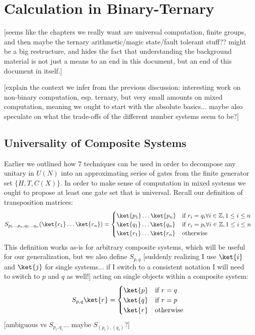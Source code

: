 \chapter[CALCULATION IN BINARY-TERNARY]{Calculation in Binary-Ternary}
[seems like the chapters we really want are universal computation, finite groups, and then maybe the ternary arithmetic/magic state/fault tolerant stuff?? might be a big restructure, and hides the fact that understanding the background material is not just a means to an end in this document, but an end of this document in itself.]

[explain the context we infer from the previous discussion: interesting work on non-binary computation, esp. ternary, but very small amounts on mixed computation, meaning we ought to start with the absolute basics... maybe also speculate on what the trade-offs of the different number systems seem to be?]
\section{Universality of Composite Systems}
Earlier we outlined how 7 techniques can be used in order to decompose any unitary in $U(N)$ into an approximating series of gates from the finite generator set $\{H, T, C(X)\}$. In order to make sense of computation in mixed systems we ought to propose at least one gate set that is universal. Recall our definition of transposition matrices:
\[S_{p_1\dots p_n, q_1\dots q_n}(\ket{r_1}\dots\ket{r_n}) = \begin{cases}
	\ket{p_1}\dots\ket{p_n} & \text{if\ } r_i = q_i \forall i \in \mathbb{Z}, 1 \leq i \leq n \\
	\ket{q_1}\dots\ket{q_n} & \text{if\ } r_i = p_i \forall i \in \mathbb{Z}, 1 \leq i \leq n \\
	\ket{r_1}\dots\ket{r_n} & \text{otherwise}
\end{cases}
\]
This definition works as-is for arbitrary composite systems, which will be useful for our generalization, but we also define $S_{p,q}$ [suddenly realizing I use $\ket{i}$ and $\ket{j}$ for single systems... if I switch to a consistent notation I will need to switch to $p$ and $q$ as well!] acting on single objects within a composite system:
\[S_{p, q}\ket{r} =
\begin{cases}
	\ket{p} & \text{if\ } r = q \\
	\ket{q} & \text{if\ } r = p \\
	\ket{r} & \text{otherwise}
\end{cases}
\]
[ambiguous vs $S_{p_i, q_i}$... maybe $S_{(p_i),(q_i)}$?]

